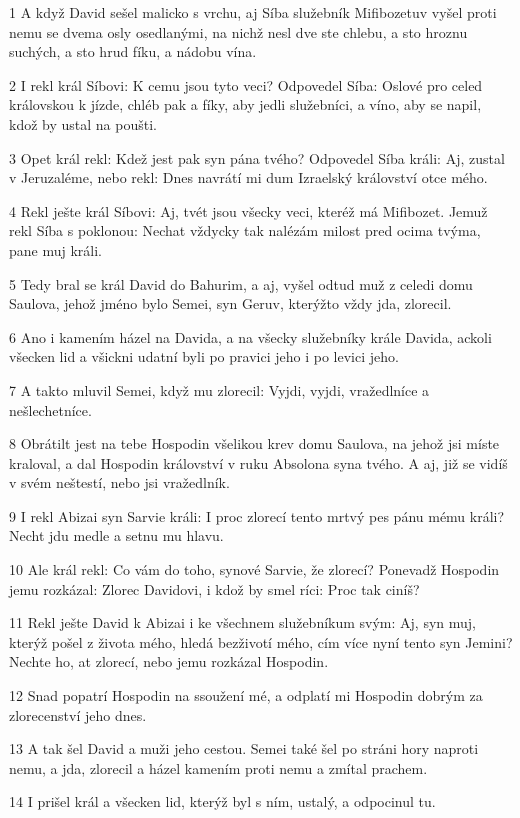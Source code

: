\par 1 A když David sešel malicko s vrchu, aj Síba služebník Mifibozetuv vyšel proti nemu se dvema osly osedlanými, na nichž nesl dve ste chlebu, a sto hroznu suchých, a sto hrud fíku, a nádobu vína.
\par 2 I rekl král Síbovi: K cemu jsou tyto veci? Odpovedel Síba: Oslové pro celed královskou k jízde, chléb pak a fíky, aby jedli služebníci, a víno, aby se napil, kdož by ustal na poušti.
\par 3 Opet král rekl: Kdež jest pak syn pána tvého? Odpovedel Síba králi: Aj, zustal v Jeruzaléme, nebo rekl: Dnes navrátí mi dum Izraelský království otce mého.
\par 4 Rekl ješte král Síbovi: Aj, tvét jsou všecky veci, kteréž má Mifibozet. Jemuž rekl Síba s poklonou: Nechat vždycky tak nalézám milost pred ocima tvýma, pane muj králi.
\par 5 Tedy bral se král David do Bahurim, a aj, vyšel odtud muž z celedi domu Saulova, jehož jméno bylo Semei, syn Geruv, kterýžto vždy jda, zlorecil.
\par 6 Ano i kamením házel na Davida, a na všecky služebníky krále Davida, ackoli všecken lid a všickni udatní byli po pravici jeho i po levici jeho.
\par 7 A takto mluvil Semei, když mu zlorecil: Vyjdi, vyjdi, vražedlníce a nešlechetníce.
\par 8 Obrátilt jest na tebe Hospodin všelikou krev domu Saulova, na jehož jsi míste kraloval, a dal Hospodin království v ruku Absolona syna tvého. A aj, již se vidíš v svém neštestí, nebo jsi vražedlník.
\par 9 I rekl Abizai syn Sarvie králi: I proc zlorecí tento mrtvý pes pánu mému králi? Necht jdu medle a setnu mu hlavu.
\par 10 Ale král rekl: Co vám do toho, synové Sarvie, že zlorecí? Ponevadž Hospodin jemu rozkázal: Zlorec Davidovi, i kdož by smel ríci: Proc tak ciníš?
\par 11 Rekl ješte David k Abizai i ke všechnem služebníkum svým: Aj, syn muj, kterýž pošel z života mého, hledá bezživotí mého, cím více nyní tento syn Jemini? Nechte ho, at zlorecí, nebo jemu rozkázal Hospodin.
\par 12 Snad popatrí Hospodin na ssoužení mé, a odplatí mi Hospodin dobrým za zlorecenství jeho dnes.
\par 13 A tak šel David a muži jeho cestou. Semei také šel po stráni hory naproti nemu, a jda, zlorecil a házel kamením proti nemu a zmítal prachem.
\par 14 I prišel král a všecken lid, kterýž byl s ním, ustalý, a odpocinul tu.
